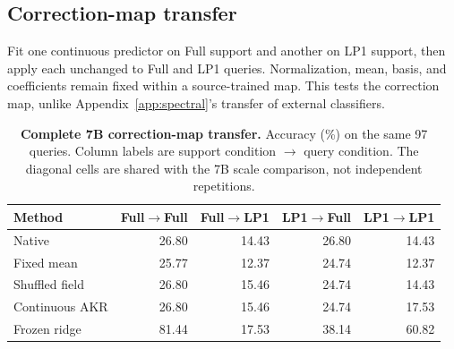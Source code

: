 \documentclass{article}
\begin{document}
\subsection{Correction-map transfer}
\label{app:completed_f2}
Fit one continuous predictor on Full support and another on LP1 support, then apply each unchanged to Full and LP1 queries. Normalization, mean, basis, and coefficients remain fixed within a source-trained map. This tests the correction map, unlike Appendix~\ref{app:spectral}'s transfer of external classifiers.

\begin{table}[htbp]
\caption{\textbf{Complete 7B correction-map transfer.} Accuracy (\%) on the same 97 queries. Column labels are support condition $\to$ query condition. The diagonal cells are shared with the 7B scale comparison, not independent repetitions.}
\label{tab:latest_transfer}
\centering\small
\begin{tabular}{@{}lrrrr@{}}
\toprule
Method & Full$\to$Full & Full$\to$LP1 & LP1$\to$Full & LP1$\to$LP1 \\
\midrule
Native & 26.80 & 14.43 & 26.80 & 14.43 \\
Fixed mean & 25.77 & 12.37 & 24.74 & 12.37 \\
Shuffled field & 26.80 & 15.46 & 24.74 & 14.43 \\
Continuous AKR & 26.80 & 15.46 & 24.74 & 17.53 \\
Frozen ridge & 81.44 & 17.53 & 38.14 & 60.82 \\
\bottomrule
\end{tabular}
\end{table}
\end{document}
